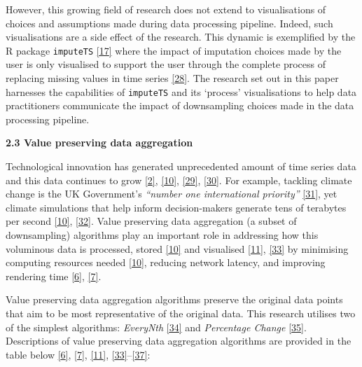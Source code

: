 \documentclass{article}
\begin{document}
However, this growing field of research does not extend to
visualisations of choices and assumptions made during data processing
pipeline. Indeed, such visualisations are a side effect of the research.
This dynamic is exemplified by the R package \texttt{imputeTS}
\protect\hyperlink{ref-imputeTS_R}{{[}17{]}} where the impact of
imputation choices made by the user is only visualised to support the
user through the complete process of replacing missing values in time
series \protect\hyperlink{ref-imputeTS}{{[}28{]}}. The research set out
in this paper harnesses the capabilities of \texttt{imputeTS} and its
`process' visualisations to help data practitioners communicate the
impact of downsampling choices made in the data processing pipeline.

\textbf{2.3 Value preserving data aggregation}

Technological innovation has generated unprecedented amount of time
series data and this data continues to grow
\protect\hyperlink{ref-data2020}{{[}2{]}},
\protect\hyperlink{ref-TVStore}{{[}10{]}},
\protect\hyperlink{ref-storage}{{[}29{]}},
\protect\hyperlink{ref-CatchUp}{{[}30{]}}. For example, tackling climate
change is the UK Government's \emph{``number one international
priority''} \protect\hyperlink{ref-IR}{{[}31{]}}, yet climate
simulations that help inform decision-makers generate tens of terabytes
per second \protect\hyperlink{ref-TVStore}{{[}10{]}},
\protect\hyperlink{ref-climate}{{[}32{]}}. Value preserving data
aggregation (a subset of downsampling) algorithms play an important role
in addressing how this voluminous data is processed, stored
\protect\hyperlink{ref-TVStore}{{[}10{]}} and visualised
\protect\hyperlink{ref-Sveinn}{{[}11{]}},
\protect\hyperlink{ref-dashql}{{[}33{]}} by minimising computing
resources needed \protect\hyperlink{ref-TVStore}{{[}10{]}}, reducing
network latency, and improving rendering time
\protect\hyperlink{ref-datapoint}{{[}6{]}},
\protect\hyperlink{ref-MinMaxLTTB}{{[}7{]}}.

Value preserving data aggregation algorithms preserve the original data
points that aim to be most representative of the original data. This
research utilises two of the simplest algorithms: \emph{EveryNth}
\protect\hyperlink{ref-EveryNth}{{[}34{]}} and \emph{Percentage Change}
\protect\hyperlink{ref-boxcar}{{[}35{]}}. Descriptions of value
preserving data aggregation algorithms are provided in the table below
\protect\hyperlink{ref-datapoint}{{[}6{]}},
\protect\hyperlink{ref-MinMaxLTTB}{{[}7{]}},
\protect\hyperlink{ref-Sveinn}{{[}11{]}},
\protect\hyperlink{ref-dashql}{{[}33{]}}--\protect\hyperlink{ref-M4}{{[}37{]}}:
\end{document}

